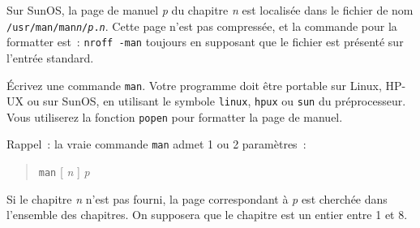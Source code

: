 Sur SunOS, la page de manuel {\em p} du chapitre {\em n} est localisée
dans le fichier de nom
{\tt /usr/man/man{\em n}/{\em p}.{\em n}}. Cette page n'est pas
compressée, et la commande pour la formatter est~:
\verb:nroff -man: toujours en supposant que le fichier est présenté sur
l'entrée standard.

Écrivez une commande {\tt man}. Votre programme doit être portable
sur Linux, HP-UX ou sur SunOS, en utilisant le symbole {\tt linux},
{\tt hpux} ou {\tt sun} du préprocesseur. Vous utiliserez la fonction
{\tt popen} pour formatter la page de manuel.

Rappel~: la vraie commande  {\tt man} admet 1 ou 2 paramètres~:

\begin {quote}
    {\tt man} [ {\em n} ] {\em p}
\end {quote}

Si le chapitre {\em n} n'est pas fourni, la page correspondant à {\em p}
est cherchée dans l'ensemble des chapitres. On supposera que le chapitre
est un entier entre 1 et 8.


